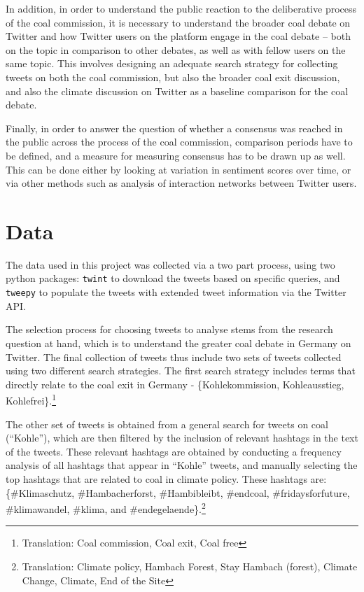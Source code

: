 \documentclass[12pt,onecolumn,twoside]{layout}
\begin{document}
In addition, in order to understand the public reaction to the deliberative process of the coal commission, it is necessary to understand the broader coal debate on Twitter and how Twitter users on the platform engage in the coal debate -- both on the topic in comparison to other debates, as well as with fellow users on the same topic. This involves designing an adequate search strategy for collecting tweets on both the coal commission, but also the broader coal exit discussion, and also the climate discussion on Twitter as a baseline comparison for the coal debate. 

Finally, in order to answer the question of whether a consensus was reached in the public across the process of the coal commission, comparison periods have to be defined, and a measure for measuring consensus has to be drawn up as well. This can be done either by looking at variation in sentiment scores over time, or via other methods such as analysis of interaction networks between Twitter users. 

\section{Data} \label{sec:data}
The data used in this project was collected via a two part process, using two python packages: \texttt{twint} to download the tweets based on specific queries, and \texttt{tweepy} to populate the tweets with extended tweet information via the Twitter API. 

The selection process for choosing tweets to analyse stems from the research question at hand, which is to understand the greater coal debate in Germany on Twitter. The final collection of tweets thus include two sets of tweets collected using two different search strategies. The first search strategy includes terms that directly relate to the coal exit in Germany - \{Kohlekommission, Kohleausstieg, Kohlefrei\}.\footnote{Translation: Coal commission, Coal exit, Coal free}

The other set of tweets is obtained from a general search for tweets on coal (``Kohle''), which are then filtered by the inclusion of relevant hashtags in the text of the tweets. These relevant hashtags are obtained by conducting a frequency analysis of all hashtags that appear in ``Kohle'' tweets, and manually selecting the top hashtags that are related to coal in climate policy. These hashtags are:  \{\#Klimaschutz, \#Hambacherforst, \#Hambibleibt, \#endcoal, \#fridaysforfuture, \#klimawandel, \#klima, and \#endegelaende\}.\footnote{Translation: Climate policy, Hambach Forest, Stay Hambach (forest), Climate Change, Climate, End of the Site} 
\end{document}
